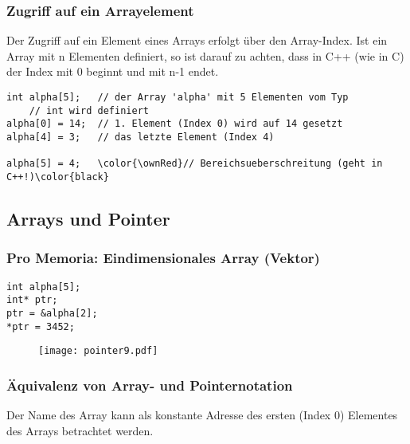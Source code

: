\subsubsection{Zugriff auf ein Arrayelement\hfill}
\label{sec:Zugriff auf ein Arrayelement}
\begin{hinweis}
Der Zugriff auf ein Element eines Arrays erfolgt über den Array-Index. Ist ein Array mit n Elementen definiert, so ist darauf zu achten, dass in C++ (wie in C) der Index mit 0 beginnt und mit n-1 endet.
\end{hinweis}
\noindent
\begin{minipage}{\linewidth}
\begin{lstlisting}
int alpha[5];	// der Array 'alpha' mit 5 Elementen vom Typ
	// int wird definiert
alpha[0] = 14;	// 1. Element (Index 0) wird auf 14 gesetzt
alpha[4] = 3;	// das letzte Element (Index 4)

alpha[5] = 4;	\color{\ownRed}// Bereichsueberschreitung (geht in C++!)\color{black}
\end{lstlisting}
\end{minipage}


\subsection{Arrays und Pointer\hfill}
\label{sec:Arrays und Pointer}

\subsubsection{Pro Memoria: Eindimensionales Array (Vektor)\hfill}
\label{sec:Pro Memoria: Eindimensionales Array (Vektor)}
\noindent
\begin{minipage}{\linewidth}
\begin{lstlisting}
int alpha[5];
int* ptr;
ptr = &alpha[2];
*ptr = 3452;
\end{lstlisting}
\end{minipage}

\begin{figure}[h]
	\centering
	\texttt{[image: pointer9.pdf]}
\end{figure}

\subsubsection{Äquivalenz von Array- und Pointernotation\hfill}
\label{sec:Aequivalenz von Array- und Pointernotation}
Der Name des Array kann als konstante Adresse des ersten (Index 0) Elementes des Arrays betrachtet werden.\\
\vspace{5mm}
\begin{figure}[h]
	\centering
	
\end{figure}

